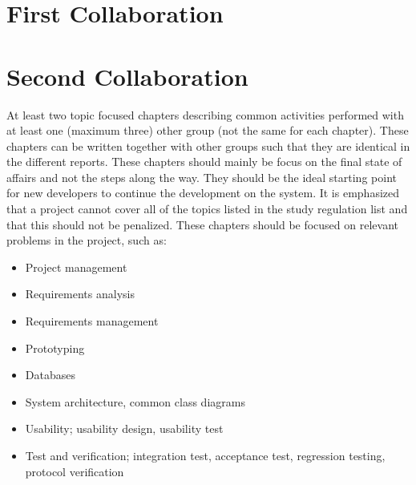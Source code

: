 \chapter{First Collaboration}

\chapter{Second Collaboration}


At least two topic focused chapters describing common activities performed with at least one (maximum three) other group (not the same for each chapter). These chapters can be written together with other groups such that they are identical in the different reports. These chapters should mainly be focus on the final state of affairs and not the steps along the way. They should be the ideal starting point for new developers to continue the development on the system. It is emphasized that a project cannot cover all of the topics listed in the study regulation list and that this should not be penalized. These chapters should be focused on relevant problems in the project, such as:

\begin{itemize}
	\item Project management
	\item Requirements analysis
	\item Requirements management
	\item Prototyping
	\item Databases
	\item System architecture, common class diagrams
	\item Usability; usability design, usability test
	\item Test and verification; integration test, acceptance test, regression testing, protocol verification
\end{itemize}


